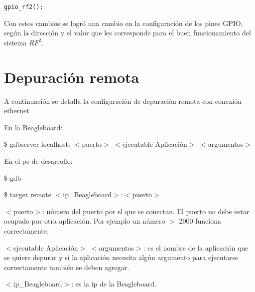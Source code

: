 \begin{verbatim}
gpio_rf2();
\end{verbatim}

Con estos cambios se logró una cambio en la configuración de los pines GPIO, según la dirección y el valor que les corresponde para el buen funcionamiento del sistema $RF^{2}$.


\section{Depuración remota}

A continuación se detalla la configuración de depuración remota con conexión ethernet.

\bigskip
En la Beagleboard:    

\bigskip                							
\centerline{\$ gdbserver localhost: $<$puerto$>$ $<$ejecutable Aplicación$>$ $<$argumentos$>$}

\bigskip
En el pc de desarrollo:

\bigskip
\centerline{\$ gdb}

\centerline{\$ target remote $<$ip\_Beagleboard$>$:$<$puerto$>$}

\bigskip
$<$puerto$>$: número del puerto por el que se conectan. El puerto no debe estar ocupado por otra aplicación. Por ejemplo un número $>$ 2000 funciona correctamente.

\bigskip
$<$ejecutable Aplicación$>$ $<$argumentos$>$: es el nombre de la aplicación que se quiere depurar y si la aplicación necesita algún argumento para ejecutarse correctamente también se deben agregar.

\bigskip
$<$ip\_Beagleboard$>$: es la ip de la Beagleboard.
